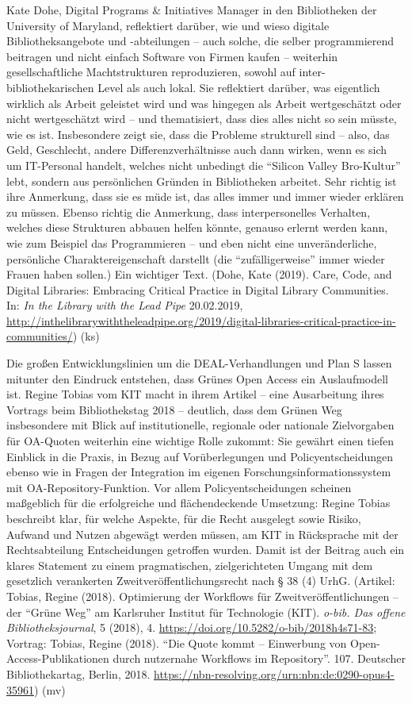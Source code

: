 \documentclass[a4paper,
fontsize=11pt,
oneside,
numbers=noperiodatend,
parskip=half-,
bibliography=totoc,
final
]{scrartcl}
\begin{document}
Kate Dohe, Digital Programs \& Initiatives Manager in den Bibliotheken
der University of Maryland, reflektiert darüber, wie und wieso digitale
Bibliotheksangebote und -abteilungen -- auch solche, die selber
programmierend beitragen und nicht einfach Software von Firmen kaufen --
weiterhin gesellschaftliche Machtstrukturen reproduzieren, sowohl auf
inter-bibliothekarischen Level als auch lokal. Sie reflektiert darüber,
was eigentlich wirklich als Arbeit geleistet wird und was hingegen als
Arbeit wertgeschätzt oder nicht wertgeschätzt wird -- und thematisiert,
dass dies alles nicht so sein müsste, wie es ist. Insbesondere zeigt
sie, dass die Probleme strukturell sind -- also, das Geld, Geschlecht,
andere Differenzverhältnisse auch dann wirken, wenn es sich um
IT-Personal handelt, welches nicht unbedingt die \enquote{Silicon Valley
Bro-Kultur} lebt, sondern aus persönlichen Gründen in Bibliotheken
arbeitet. Sehr richtig ist ihre Anmerkung, dass sie es müde ist, das
alles immer und immer wieder erklären zu müssen. Ebenso richtig die
Anmerkung, dass interpersonelles Verhalten, welches diese Strukturen
abbauen helfen könnte, genauso erlernt werden kann, wie zum Beispiel das
Programmieren -- und eben nicht eine unveränderliche, persönliche
Charaktereigenschaft darstellt (die \enquote{zufälligerweise} immer
wieder Frauen haben sollen.) Ein wichtiger Text. (Dohe, Kate (2019).
Care, Code, and Digital Libraries: Embracing Critical Practice in
Digital Library Communities. In: \emph{In the Library with the Lead
Pipe} 20.02.2019,
\url{http://inthelibrarywiththeleadpipe.org/2019/digital-libraries-critical-practice-in-communities/})
(ks)

Die großen Entwicklungslinien um die DEAL-Verhandlungen und Plan S
lassen mitunter den Eindruck entstehen, dass Grünes Open Access ein
Auslaufmodell ist. Regine Tobias vom KIT macht in ihrem Artikel -- eine
Ausarbeitung ihres Vortrags beim Bibliothekstag 2018 -- deutlich, dass
dem Grünen Weg insbesondere mit Blick auf institutionelle, regionale
oder nationale Zielvorgaben für OA-Quoten weiterhin eine wichtige Rolle
zukommt: Sie gewährt einen tiefen Einblick in die Praxis, in Bezug auf
Vorüberlegungen und Policyentscheidungen ebenso wie in Fragen der
Integration im eigenen Forschungsinformationssystem mit
OA-Repository-Funktion. Vor allem Policyentscheidungen scheinen
maßgeblich für die erfolgreiche und flächendeckende Umsetzung: Regine
Tobias beschreibt klar, für welche Aspekte, für die Recht ausgelegt
sowie Risiko, Aufwand und Nutzen abgewägt werden müssen, am KIT in
Rücksprache mit der Rechtsabteilung Entscheidungen getroffen wurden.
Damit ist der Beitrag auch ein klares Statement zu einem pragmatischen,
zielgerichteten Umgang mit dem gesetzlich verankerten
Zweitveröffentlichungsrecht nach § 38 (4) UrhG. (Artikel: Tobias, Regine
(2018). Optimierung der Workflows für Zweitveröffentlichungen -- der
\enquote{Grüne Weg} am Karlsruher Institut für Technologie (KIT).
\emph{o-bib. Das offene Bibliotheksjournal}, 5 (2018), 4.
\url{https://doi.org/10.5282/o-bib/2018h4s71-83}; Vortrag: Tobias,
Regine (2018). \enquote{Die Quote kommt -- Einwerbung von
Open-Access-Publikationen durch nutzernahe Workflows im Repository}.
107. Deutscher Bibliothekartag, Berlin, 2018.
\url{https://nbn-resolving.org/urn:nbn:de:0290-opus4-35961}) (mv)
\end{document}
